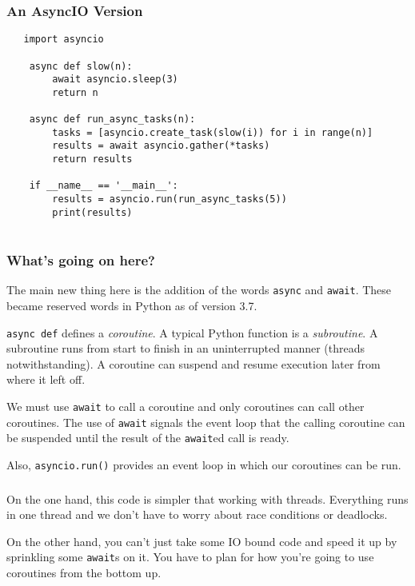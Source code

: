 \documentclass[10pt]{beamer}
\begin{document}
\begin{frame}[fragile]
  \frametitle{An AsyncIO Version}
  
  \begin{verbatim}
   import asyncio

    async def slow(n):
        await asyncio.sleep(3)
        return n

    async def run_async_tasks(n):
        tasks = [asyncio.create_task(slow(i)) for i in range(n)]
        results = await asyncio.gather(*tasks)
        return results

    if __name__ == '__main__':
        results = asyncio.run(run_async_tasks(5))
        print(results)
     
  \end{verbatim}
    
  \end{frame}

\begin{frame}
  \frametitle{What's going on here?}

  The main new thing here is the addition of the words \texttt{async} and
  \texttt{await}. These became reserved words in Python as of version 3.7.
  
  \vspace{5mm}
  \texttt{async def} defines a \emph{coroutine}. A typical Python function is
  a \emph{subroutine}. A subroutine runs from start to finish in an uninterrupted 
  manner (threads notwithstanding). A coroutine can suspend and resume execution 
  later from where it left off.
  
  \vspace{5mm}
  We must use \texttt{await} to call a coroutine and only coroutines can call other
  coroutines. The use of \texttt{await} signals the event loop that the calling coroutine
  can be suspended until the result of the \texttt{await}ed call is ready.
  
  \vspace{5mm}
  Also, \texttt{asyncio.run()} provides an event loop in which our coroutines can be run.
\end{frame}

\begin{frame}
  \frametitle{}

  On the one hand, this code is simpler that working with threads. Everything
  runs in one thread and we don't have to worry about race conditions or deadlocks.
  
  \vspace{5mm}
  On the other hand, you can't just take some IO bound code and speed it up by
  sprinkling some \texttt{await}s on it. You have to plan for how you're going to 
  use coroutines from the bottom up. 
  \end{frame}
\end{document}
